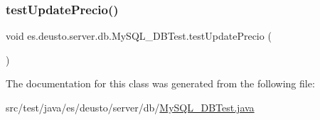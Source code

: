 \mbox{\label{classes_1_1deusto_1_1server_1_1db_1_1_my_s_q_l___d_b_test_adb0535409018f97c00bbf1456e33df32}} 
\subsubsection{\texorpdfstring{testUpdatePrecio()}{testUpdatePrecio()}}
{\footnotesize\ttfamily void es.\+deusto.\+server.\+db.\+My\+S\+Q\+L\+\_\+\+D\+B\+Test.\+test\+Update\+Precio (\begin{DoxyParamCaption}{ }\end{DoxyParamCaption})}



The documentation for this class was generated from the following file\+:\begin{DoxyCompactItemize}
\item 
src/test/java/es/deusto/server/db/\mbox{\hyperlink{_my_s_q_l___d_b_test_8java}{My\+S\+Q\+L\+\_\+\+D\+B\+Test.\+java}}\end{DoxyCompactItemize}
